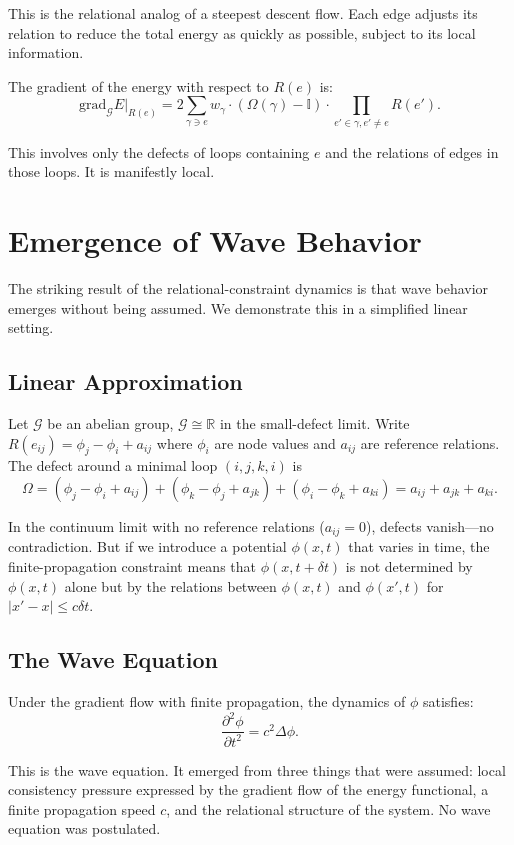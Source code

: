 \documentclass[12pt,a4paper,openany]{book}
\theoremstyle{plain}
\theoremstyle{definition}
\theoremstyle{remark}
\newcommand{\GG}{\mathcal{G}}
\newcommand{\RR}{\mathbb{R}}
\newcommand{\id}{\mathbb{I}}
\newcommand{\defect}{\Omega}
\newcommand{\Energy}{E}
\newcommand{\del}{\partial}
\newcommand{\lap}{\Delta}
\begin{document}
This is the relational analog of a steepest descent flow. Each edge adjusts its relation to reduce the total energy as quickly as possible, subject to its local information.

The gradient of the energy with respect to $R(e)$ is:
\[
\text{grad}_\GG \Energy\big|_{R(e)} = 2 \sum_{\gamma \ni e} w_\gamma \cdot (\defect(\gamma) - \id) \cdot \prod_{e' \in \gamma, e' \neq e} R(e').
\]

This involves only the defects of loops containing $e$ and the relations of edges in those loops. It is manifestly local.

\section{Emergence of Wave Behavior}

The striking result of the relational-constraint dynamics is that wave behavior emerges without being assumed. We demonstrate this in a simplified linear setting.

\subsection{Linear Approximation}

Let $\GG$ be an abelian group, $\GG \cong \RR$ in the small-defect limit. Write $R(e_{ij}) = \phi_j - \phi_i + a_{ij}$ where $\phi_i$ are node values and $a_{ij}$ are reference relations. The defect around a minimal loop $(i, j, k, i)$ is
\[
\defect = (\phi_j - \phi_i + a_{ij}) + (\phi_k - \phi_j + a_{jk}) + (\phi_i - \phi_k + a_{ki}) = a_{ij} + a_{jk} + a_{ki}.
\]

In the continuum limit with no reference relations ($a_{ij} = 0$), defects vanish---no contradiction. But if we introduce a potential $\phi(x,t)$ that varies in time, the finite-propagation constraint means that $\phi(x, t+\delta t)$ is not determined by $\phi(x, t)$ alone but by the relations between $\phi(x, t)$ and $\phi(x', t)$ for $|x' - x| \leq c \delta t$.

\subsection{The Wave Equation}

Under the gradient flow with finite propagation, the dynamics of $\phi$ satisfies:
\[
\frac{\del^2 \phi}{\del t^2} = c^2 \lap \phi.
\]

This is the wave equation. It emerged from three things that were assumed: local consistency pressure expressed by the gradient flow of the energy functional, a finite propagation speed $c$, and the relational structure of the system. No wave equation was postulated.
\end{document}
